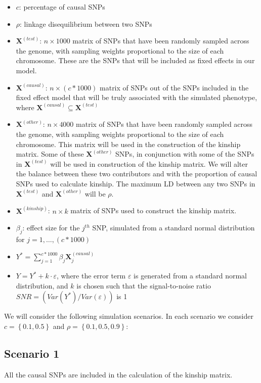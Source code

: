 \documentclass[12pt,letter]{article}\usepackage[]{graphicx}\usepackage[]{color}
\newcommand{\bX}{\textbf{X}}
\begin{document}
\begin{itemize}
	\item $c$: percentage of causal SNPs
	\item $\rho$: linkage disequilibrium between two SNPs
	\item $\bX^{(test)}$: $n \times 1000$ matrix of SNPs that have been randomly sampled across the genome, with sampling weights proportional to the size of each chromosome. These are the SNPs that will be included as fixed effects in our model.
	\item $\bX^{(causal)}$: $n \times (c*1000)$ matrix of SNPs out of the SNPs included in the fixed effect model that will be truly associated with the simulated phenotype, where $\bX^{(causal)} \subseteq \bX^{(test)}$
	\item $\bX^{(other)}$: $n \times 4000$ matrix of SNPs that have been randomly sampled across the genome, with sampling weights proportional to the size of each chromosome. This matrix will be used in the construction of the kinship matrix. Some of these $\bX^{(other)}$ SNPs, in conjunction with some of the SNPs in $\bX^{(test)}$ will be used in construction of the kinship matrix. We will alter the balance between these two contributors and with the proportion of causal SNPs used to calculate kinship. The maximum LD between any two SNPs in $\bX^{(test)}$ and $\bX^{(other)}$ will be $\rho$.
	\item $\bX^{(kinship)}$: $n \times k$ matrix of SNPs used to construct the kinship matrix.
	\item $\beta_j$: effect size for the $j^{th}$ SNP, simulated from a standard normal distribution for $j = 1, \ldots, (c*1000)$
	\item $Y^* = \sum_{j=1}^{c*1000} \beta_j \bX^{(causal)}_j$
	\item $Y = Y^* + k \cdot \varepsilon$, where the error term $\varepsilon$ is generated from a standard normal distribution, and $k$ is chosen such that the signal-to-noise ratio $SNR =\left(Var(Y^*)/Var(\varepsilon)\right)$ is 1
\end{itemize}

We will consider the following simulation scenarios. In each scenario we consider \mbox{$c = \left\lbrace 0.1, 0.5 \right\rbrace$} and \mbox{$\rho = \left\lbrace 0.1, 0.5, 0.9 \right\rbrace$}:

\subsection*{Scenario 1}
All the causal SNPs are included in the calculation of the kinship matrix.
\end{document}
